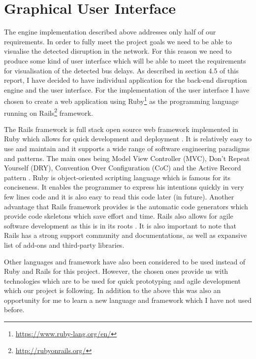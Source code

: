 \FloatBarrier
\section{Graphical User Interface}
The engine implementation described above addresses only half of our requirements. In order to fully meet the project goals we need to be able to visualise the detected disruption in the network. For this reason we need to produce some kind of user interface which will be able to meet the requirements for visualisation of the detected bus delays. As described in section 4.5 of this report, I have decided to have individual application for the back-end disruption engine and the user interface. For the implementation of the user interface I have chosen to create a web application using Ruby\footnote{\url{https://www.ruby-lang.org/en/}} as the programming language running on Rails\footnote{\url{http://rubyonrails.org/}} framework.

The Rails framework is full stack open source web framework implemented in Ruby which allows for quick development and deployment \cite{guide2006agile}. It is relatively easy to use and maintain and it supports a wide range of software engineering paradigms and patterns. The main ones being Model View Controller (MVC), Don't Repeat Yourself (DRY), Convention Over Configuration (CoC) and the Active Record pattern \cite{fowler2003patterns}. Ruby is object-oriented scripting language which is famous for its conciseness. It enables the programmer to express his intentions quickly in very few lines code and it is also easy to read this code later (in future). Another advantage that Rails framework provides is the automatic code generators which provide code skeletons which save effort and time. Rails also allows for agile software development as this is in its roots \cite{guide2006agile}. It is also important to note that Rails has a strong support community and documentations, as well as expansive list of add-ons and third-party libraries.

Other languages and framework have also been considered to be used instead of Ruby and Rails for this project. However, the chosen ones provide us with technologies which are to be used for quick prototyping and agile development which our project is following. In addition to the above this was also an opportunity for me to learn a new language and framework which I have not used before.

